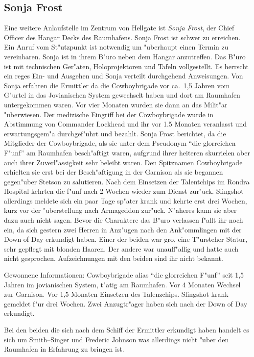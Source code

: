 \subsection{Sonja Frost}

Eine weitere Anlaufstelle im Zentrum von Hellgate ist \emph{Sonja Frost}, der Chief Officer des Hangar Decks des Raumhafens. Sonja Frost ist schwer zu erreichen. Ein Anruf vom St"utzpunkt ist notwendig um "uberhaupt einen Termin zu vereinbaren. Sonja ist in ihrem B"uro neben dem Hangar anzutreffen. Das B"uro ist mit technischen Ger"aten, Holoprojektoren und Tafeln vollgestellt. Es herrscht ein reges Ein- und Ausgehen und Sonja verteilt durchgehend Anweisungen. Von Sonja erfahren die Ermittler da\3 die Cowboybrigade vor ca.~1,5 Jahren vom G"urtel in das Jovianischen System gewechselt haben und dort am Raumhafen untergekommen waren. Vor vier Monaten wurden sie dann an das Milit"ar "uberwiesen. Der medizische Eingriff bei der Cowboybrigade wurde in Abstimmung von Commander Lockhead und ihr vor 1.5 Monaten veranlasst und erwartungsgem"a\3 durchgef"uhrt und bezahlt. Sonja Frost berichtet, da\3 die Mitglieder der Cowboybrigade, als sie unter dem Pseudonym "`die glorreichen F"unf"' am Raumhafen besch"aftigt waren, aufgrund ihrer heiteren skurrielen aber auch ihrer Zuverl"assigkeit sehr beleibt waren.  Den Spitznamen Cowboybrigade erhielten sie erst bei der Besch"aftigung in der Garnison als sie begannen gegen"uber Stetson zu salutieren. Nach dem Einsetzen der Talentchips im Rondra Hospital kehrten die f"unf nach 2 Wochen wieder zum Dienst zur"uck. Slingshot allerdings meldete sich ein paar Tage sp"ater krank und kehrte erst drei Wochen, kurz vor der "uberstellung nach Armageddon zur"uck. N"aheres kann sie aber dazu auch nicht sagen. Bevor die Charaktere das B"uro verlassen f"allt ihr noch ein, da\3 sich gestern zwei Herren in Anz"ugen nach den Ank"ommlingen mit der Down of Day erkundigt haben. Einer der beiden war gro\3, eine T"ursteher Statur, sehr gepflegt mit blonden Haaren. Der andere war unauff"allig und hatte auch nicht gesprochen. Aufzeichnungen mit den beiden sind ihr nicht bekannt.


\begin{remarks}
	Gewonnene Informationen: Cowboybrigade alias "`die glorreichen F"unf"' seit 1,5 Jahren im jovianischen System, t"atig am Raumhafen. Vor 4 Monaten Wechsel zur Garnison. Vor 1,5 Monaten Einsetzen des Talenzchips. Slingshot krank gemeldet f"ur drei Wochen. Zwei Anzugtr"ager haben sich nach der Down of Day erkundigt.

	Bei den beiden die sich nach dem Schiff der Ermittler erkundigt haben handelt es sich um Smith--Singer und Frederic Johnson was allerdings nicht "uber den Raumhafen in Erfahrung zu bringen ist.
\end{remarks}


